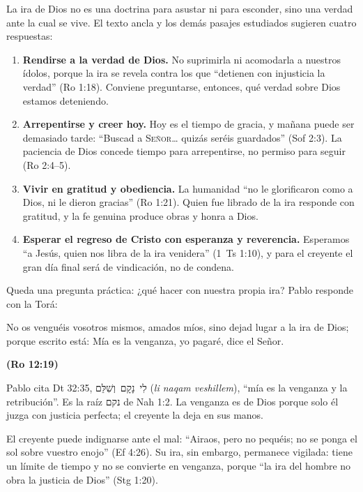 \documentclass[11pt,letterpaper]{article}
\newcommand{\heb}[1]{\mbox{\foreignlanguage{hebrew}{#1}}}
\newcommand{\SENOR}{\textsc{Señor}}
\newcommand{\fuente}[1]{\par\hfill{\upshape\bfseries\small\textcolor{azul}{#1}}}
\begin{document}
La ira de Dios no es una doctrina para asustar ni para esconder, sino una verdad ante la cual se vive. El texto ancla y los demás pasajes estudiados sugieren cuatro respuestas:

\begin{enumerate}
\item \textbf{Rendirse a la verdad de Dios.} No suprimirla ni acomodarla a nuestros ídolos, porque la ira se revela contra los que ``detienen con injusticia la verdad'' (Ro 1:18). Conviene preguntarse, entonces, qué verdad sobre Dios estamos deteniendo.
\item \textbf{Arrepentirse y creer hoy.} Hoy es el tiempo de gracia, y mañana puede ser demasiado tarde: ``Buscad a \SENOR{}\ldots{} quizás seréis guardados'' (Sof 2:3). La paciencia de Dios concede tiempo para arrepentirse, no permiso para seguir (Ro 2:4--5).
\item \textbf{Vivir en gratitud y obediencia.} La humanidad ``no le glorificaron como a Dios, ni le dieron gracias'' (Ro 1:21). Quien fue librado de la ira responde con gratitud, y la fe genuina produce obras y honra a Dios.
\item \textbf{Esperar el regreso de Cristo con esperanza y reverencia.} Esperamos ``a Jesús, quien nos libra de la ira venidera'' (1~Ts 1:10), y para el creyente el gran día final será de vindicación, no de condena.
\end{enumerate}

Queda una pregunta práctica: ¿qué hacer con nuestra propia ira? Pablo responde con la Torá:

\begin{cita}No os venguéis vosotros mismos, amados míos, sino dejad lugar a la ira de Dios; porque escrito está: Mía es la venganza, yo pagaré, dice el Señor.\fuente{(Ro 12:19)}\end{cita}

\begin{filologia}[Ro 12:19]
Pablo cita Dt 32:35, \heb{לִי נָקָם וְשִׁלֵּם} (\emph{li naqam veshillem}), ``mía es la venganza y la retribución''. Es la raíz \heb{נקם} de Nah 1:2. La venganza es de Dios porque solo él juzga con justicia perfecta; el creyente la deja en sus manos.
\end{filologia}

El creyente puede indignarse ante el mal: ``Airaos, pero no pequéis; no se ponga el sol sobre vuestro enojo'' (Ef 4:26). Su ira, sin embargo, permanece vigilada: tiene un límite de tiempo y no se convierte en venganza, porque ``la ira del hombre no obra la justicia de Dios'' (Stg 1:20).
\end{document}
